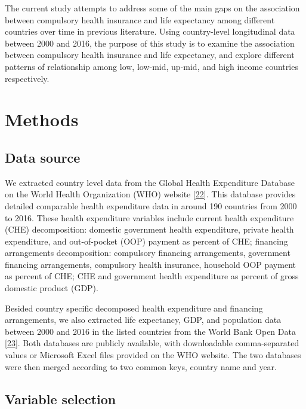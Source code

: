 \documentclass[]{elsarticle} %
\begin{document}
The current study attempts to address some of the main gaps on the association between compulsory health insurance and life expectancy among different countries over time in previous literature. Using country-level longitudinal data between 2000 and 2016, the purpose of this study is to examine the association between compulsory health insurance and life expectancy, and explore different patterns of relationship among low, low-mid, up-mid, and high income countries respectively.

\hypertarget{methods}{%
\section{Methods}\label{methods}}

\hypertarget{data-source}{%
\subsection{Data source}\label{data-source}}

We extracted country level data from the Global Health Expenditure Database on the World Health Organization (WHO) website {[}\protect\hyperlink{ref-WHOdata}{22}{]}.
This database provides detailed comparable health expenditure data in around 190 countries from 2000 to 2016.
These health expenditure variables include current health expenditure (CHE) decomposition: domestic government health expenditure, private health expenditure, and out-of-pocket (OOP) payment as percent of CHE;
financing arrangements decomposition: compulsory financing arrangements, government financing arrangements, compulsory health insurance, household OOP payment as percent of CHE; CHE and government health expenditure as percent of gross domestic product (GDP).

Besided country specific decomposed health expenditure and financing arrangements, we also extracted life expectancy, GDP, and population data between 2000 and 2016 in the listed countries from the World Bank Open Data {[}\protect\hyperlink{ref-worldbank}{23}{]}.
Both databases are publicly available, with downloadable comma-separated values or Microsoft Excel files provided on the WHO website.
The two databases were then merged according to two common keys, country name and year.

\hypertarget{variable-selection}{%
\subsection{Variable selection}\label{variable-selection}}
\end{document}
